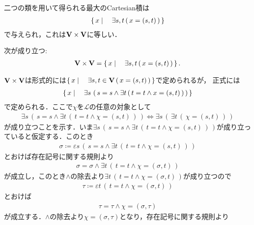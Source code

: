 	二つの類を用いて得られる最大のCartesian積は
	\begin{align}
		\left\{\, x \mid \quad \exists s,t\, (\, x=(s,t)\, )\, \right\}
	\end{align}
	で与えられ，これは$\mathbf{V} \times \mathbf{V}$に等しい．
	
	\begin{screen}
		\begin{thm}
			次が成り立つ:
			\begin{align}
				\mathbf{V} \times \mathbf{V} = \left\{\, x \mid \quad \exists s,t\, (\, x=(s,t)\, )\, \right\}.
			\end{align}
		\end{thm}
	\end{screen}
	
	\begin{prf}
		$\mathbf{V} \times \mathbf{V}$は形式的には$\left\{\, x \mid \quad \exists s,t \in \mathbf{V}\, (\, x=(s,t)\, )\, \right\}$で定められるが，
		正式には
		\begin{align}
			\left\{\, x \mid \quad \exists s\, \left(\, s = s \wedge \exists t\, (\, t=t \wedge x=(s,t)\, )\, \right)\, \right\}
		\end{align}
		で定められる．ここで$\chi$を$\mathcal{L}$の任意の対象として
		\begin{align}
			\exists s\, \left(\, s = s \wedge \exists t\, (\, t=t \wedge \chi=(s,t)\, )\, \right)
			\Longleftrightarrow \exists s\, \left(\, \exists t\, (\, \chi=(s,t)\, )\, \right)
			\label{eq:thm_Cartesian_product_of_the_Universe}
		\end{align}
		が成り立つことを示す．いま$\exists s\, \left(\, s = s \wedge \exists t\, (\, t=t \wedge \chi=(s,t)\, )\, \right)$が成り立っていると仮定する．このとき
		\begin{align}
			\sigma \coloneqq \varepsilon s\, \left(\, s = s \wedge \exists t\, (\, t=t \wedge \chi=(s,t)\, )\, \right)
		\end{align}
		とおけば存在記号に関する規則より
		\begin{align}
			\sigma = \sigma \wedge \exists t\, (\, t=t \wedge \chi=(\sigma,t)\, )
		\end{align}
		が成立し，このとき$\wedge$の除去より$\exists t\, (\, t=t \wedge \chi=(\sigma,t)\, )$が成り立つので
		\begin{align}
			\tau \coloneqq \varepsilon t\, (\, t=t \wedge \chi=(\sigma,t)\, )
		\end{align}
		とおけば
		\begin{align}
			\tau = \tau \wedge \chi = (\sigma,\tau)
		\end{align}
		が成立する．$\wedge$の除去より$\chi = (\sigma,\tau)$となり，存在記号に関する規則より

\end{prf}
